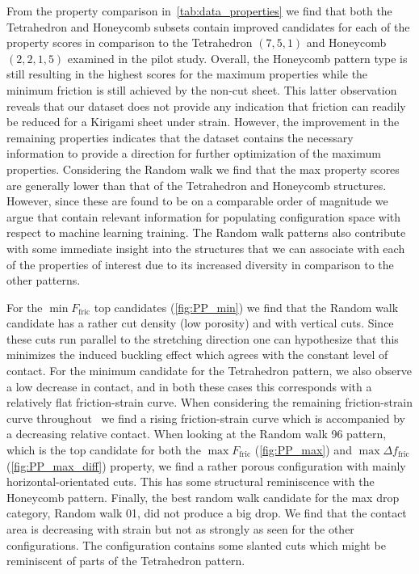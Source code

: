From the property comparison in~\cref{tab:data_properties} we find that both the
Tetrahedron and Honeycomb subsets contain improved candidates for each of the
property scores in comparison to the Tetrahedron $(7,5,1)$ and Honeycomb
$(2,2,1,5)$ examined in the pilot study. Overall, the Honeycomb pattern type is
still resulting in the highest scores for the maximum properties while the
minimum friction is still achieved by the non-cut sheet. This latter observation
reveals that our dataset does not provide any indication that friction can readily be reduced for a Kirigami sheet under strain. However, the improvement in the
remaining properties indicates that the dataset contains the necessary
information to provide a direction for further optimization of the maximum properties. Considering the Random walk we find that the max property scores are generally lower than that of the Tetrahedron and Honeycomb structures. However, since these are found to be on a comparable order of magnitude we argue that contain relevant information for populating configuration space with respect to machine learning training. The Random walk patterns also contribute with some immediate insight into the structures that we can associate with each of the properties of interest due to its increased diversity in comparison to the other patterns.

For the $\min F_{\text{fric}}$ top candidates (\cref{fig:PP_min}) we find that
the Random walk candidate has a rather cut density (low porosity) and with
vertical cuts. Since these cuts run parallel to the stretching direction one can
hypothesize that this minimizes the induced buckling effect which agrees with
the constant level of contact. For the minimum candidate for the Tetrahedron
pattern, we also observe a low decrease in contact, and in both these cases this
corresponds with a relatively flat friction-strain curve. When considering the
remaining friction-strain curve
throughout~ we find a rising
friction-strain curve which is accompanied by a decreasing relative contact.
When looking at the Random walk 96 pattern, which is the top candidate for both
the $\max F_{\text{fric}}$ (\cref{fig:PP_max}) and $\max \Delta f_{\text{fric}}$
(\cref{fig:PP_max_diff}) property, we find a rather porous configuration with
mainly horizontal-orientated cuts. This has some structural reminiscence with the Honeycomb pattern. Finally, the best random walk candidate for the max drop category, Random walk 01, did not produce a big drop. We find that the contact area is decreasing with strain but not as strongly as seen for the other configurations. The configuration contains some slanted cuts which might be reminiscent of parts of the Tetrahedron pattern. 





